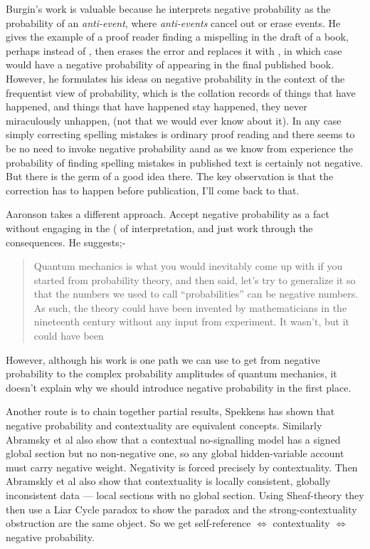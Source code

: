 \documentclass{article}
\begin{document}
Burgin's work is valuable because he interprets negative probability as the probability of an \emph{anti-event}, where \emph{anti-events} cancel out or erase events. He gives the example of a proof reader finding a mispelling in the draft of a book, perhaps  instead of , then erases the error and replaces it with , in which case  would have a negative probability of appearing in the final published book. However, he formulates his ideas on negative probability in the context of the frequentist view of probability, which is the collation records of things that have happened, and things that have happened stay happened, they never miraculously unhappen, (not that we would ever know about it). In any case simply correcting spelling mistakes is ordinary proof reading and there seems to be no need to invoke negative probability aand as we know from experience the probability of finding spelling mistakes in published text is certainly not negative. But there is the germ of a good idea there. The key observation is that the correction has to happen before publication, I'll come back to that. 

Aaronson \autocite{aaronson_lect9, Aaronson:dem} takes a different approach. Accept negative probability as a fact without engaging in  the (\autocite{Cardano_1545} of interpretation, and just work through the consequences. He suggests;-
\begin{quotation}
    Quantum mechanics is what you would inevitably come up with if you started from probability theory, and then said, let's try to generalize it so that the numbers we used to call “probabilities” can be negative numbers. As such, the theory could have been invented by mathematicians in the nineteenth century without any input from experiment. It wasn't, but it could have been
     \par
  \hfill \autocite{Aaronson:dem}
\end{quotation}
However, although his work is one path we can use to get from negative probability to the complex probability amplitudes of quantum mechanics, it doesn't explain why we should introduce negative probability in the first place. 

Another route is to chain together partial results, Spekkens \autocite{spekkens_contextuality_2007} has shown that negative probability and contextuality are equivalent concepts. Similarly Abramsky et al \autocite{Abramsky2014} also show that a contextual no-signalling model has a signed global section but no non-negative one, so any global hidden-variable account must carry negative weight. Negativity is forced precisely by contextuality. Then Abramskly et al \autocite{Abramsky2015} also show that contextuality is locally consistent, globally inconsistent data — local sections with no global section. Using Sheaf-theory they then use a Liar Cycle paradox to show the paradox and the strong-contextuality obstruction are the same object. So we get self-reference  $\iff$ contextuality $\iff$ negative probability.
\end{document}

